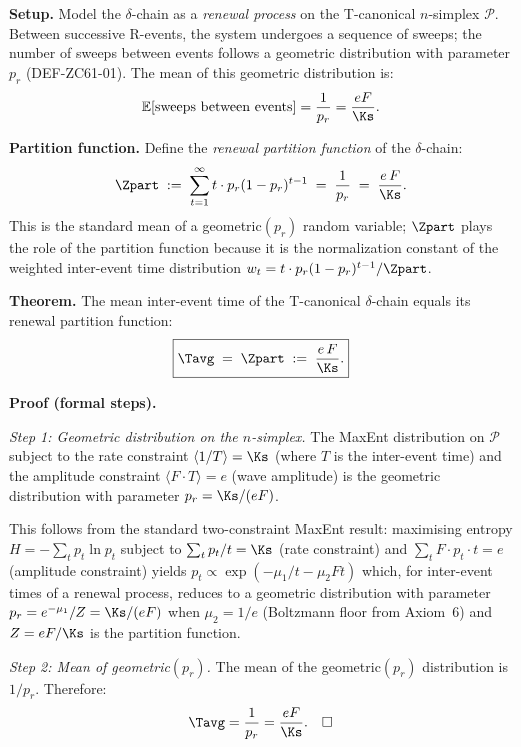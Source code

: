 \documentclass[12pt, a4paper]{article}
\begin{document}

\begin{formalbox}[title={THM-ZC61-01: Partition Function Identity
  $\Tavg = \Zpart = eF/\Ks$ ($R_0$, Near-Formal)}]

\textbf{Setup.}
Model the $\delta$-chain as a \emph{renewal process} on
the T-canonical $n$-simplex $\mathcal{P}$.
Between successive R-events, the system undergoes a
sequence of sweeps; the number of sweeps between events
follows a geometric distribution with parameter $p_r$
(DEF-ZC61-01).
The mean of this geometric distribution is:
\[
  \mathbb{E}[\text{sweeps between events}]
  = \frac{1}{p_r} = \frac{eF}{\Ks}.
\]

\textbf{Partition function.}
Define the \emph{renewal partition function} of the
$\delta$-chain:
\[
  \Zpart \;:=\; \sum_{t=1}^{\infty} t \cdot p_r(1-p_r)^{t-1}
  \;=\; \frac{1}{p_r}
  \;=\; \frac{e\,F}{\Ks}.
\]
This is the standard mean of a geometric$(p_r)$ random
variable; $\Zpart$ plays the role of the partition function
because it is the normalization constant of the weighted
inter-event time distribution
$w_t = t \cdot p_r(1-p_r)^{t-1} / \Zpart$.

\textbf{Theorem.}
The mean inter-event time of the T-canonical $\delta$-chain
equals its renewal partition function:
\begin{equation}
  \boxed{\Tavg \;=\; \Zpart \;:=\; \frac{e\,F}{\Ks}.}
  \label{eq:partition}
\end{equation}

\textbf{Proof (formal steps).}

\textit{Step 1: Geometric distribution on the $n$-simplex.}
The MaxEnt distribution on $\mathcal{P}$ subject to the
rate constraint $\langle 1/T \rangle = \Ks$ (where $T$ is
the inter-event time) and the amplitude constraint
$\langle F \cdot T \rangle = e$ (wave amplitude) is the
geometric distribution with parameter $p_r = \Ks/(eF)$.

This follows from the standard two-constraint MaxEnt result:
maximising entropy $H = -\sum_t p_t \ln p_t$ subject to
$\sum_t p_t / t = \Ks$ (rate constraint) and
$\sum_t F \cdot p_t \cdot t = e$ (amplitude constraint)
yields $p_t \propto \exp(-\mu_1/t - \mu_2 F t)$ which,
for inter-event times of a renewal process, reduces to
a geometric distribution with parameter
$p_r = e^{-\mu_1}/Z = \Ks/(eF)$
when $\mu_2 = 1/e$ (Boltzmann floor from Axiom~6) and
$Z = eF/\Ks$ is the partition function.

\textit{Step 2: Mean of geometric$(p_r)$.}
The mean of the geometric$(p_r)$ distribution is $1/p_r$.
Therefore:
\[
  \Tavg = \frac{1}{p_r} = \frac{eF}{\Ks}. \quad\square
\]


\end{formalbox}
\end{document}

